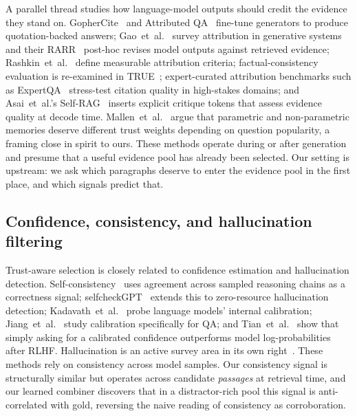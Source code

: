 A parallel thread studies how language-model outputs should credit the
evidence they stand on. GopherCite~\cite{menick2022gophercite} and
Attributed QA~\cite{bohnet2022attributed} fine-tune generators to
produce quotation-backed answers; Gao~et~al.~\cite{gao2023enabling}
survey attribution in generative systems and their
RARR~\cite{gao2023rarr} post-hoc revises model outputs against
retrieved evidence; Rashkin~et~al.~\cite{rashkin2023measuring} define
measurable attribution criteria; factual-consistency evaluation is
re-examined in TRUE~\cite{honovich2022true}; expert-curated
attribution benchmarks such as ExpertQA~\cite{malaviya2023expertqa}
stress-test citation quality in high-stakes domains; and Asai~et~al.'s
Self-RAG~\cite{asai2024selfrag} inserts explicit critique tokens that
assess evidence quality at decode time. Mallen~et~al.~\cite{mallen2023when}
argue that parametric and non-parametric memories deserve different
trust weights depending on question popularity, a framing close in
spirit to ours. These methods operate during or after generation and
presume that a useful evidence pool has already been selected. Our
setting is upstream: we ask which paragraphs deserve to enter the
evidence pool in the first place, and which signals predict that.

\subsection{Confidence, consistency, and hallucination filtering}

Trust-aware selection is closely related to confidence estimation and
hallucination detection. Self-consistency~\cite{wang2023selfconsistency}
uses agreement across sampled reasoning chains as a correctness
signal; selfcheckGPT~\cite{manakul2023selfcheckgpt} extends this to
zero-resource hallucination detection;
Kadavath~et~al.~\cite{kadavath2022language} probe language models'
internal calibration; Jiang~et~al.~\cite{jiang2021know} study
calibration specifically for QA; and
Tian~et~al.~\cite{tian2023justask} show that simply asking for a
calibrated confidence outperforms model log-probabilities after RLHF.
Hallucination is an active survey area in its own
right~\cite{ji2023survey,zhang2023siren,li2024evaluating}. These
methods rely on consistency across model samples. Our consistency
signal is structurally similar but operates across candidate
\emph{passages} at retrieval time, and our learned combiner discovers
that in a distractor-rich pool this signal is anti-correlated with
gold, reversing the naive reading of consistency as corroboration.

